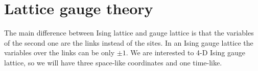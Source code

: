 \section{Lattice gauge theory}
        The main difference between Ising lattice and gauge lattice is that the variables of the second one are the links instead of the sites. In an 
        Ising gauge lattice the variables over the links can be only $\pm 1$. We are interested to 4-D Ising gauge lattice, so we will have three space-like coordinates
        and one time-like.